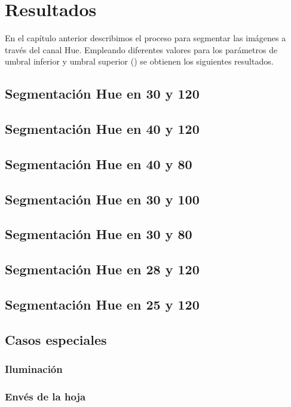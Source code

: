 \chapter{Resultados}
En el capítulo anterior describimos el proceso para segmentar las imágenes a través del canal Hue. Empleando diferentes valores para los parámetros de umbral inferior y umbral superior () se obtienen los siguientes resultados.

\section{Segmentación Hue en 30 y 120}


\section{Segmentación Hue en 40 y 120}


\section{Segmentación Hue en 40 y 80}


\section{Segmentación Hue en 30 y 100}


\section{Segmentación Hue en 30 y 80}


\section{Segmentación Hue en 28 y 120}


\section{Segmentación Hue en 25 y 120}


\section{Casos especiales}

\subsection{Iluminación}

\subsection{Envés de la hoja}